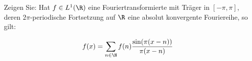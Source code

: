 
\begin{exercise}

Zeigen Sie:
Hat $f \in L^1(\R)$ eine Fouriertransformierte mit Träger in $[-\pi, \pi]$, deren $2 \pi$-periodische Fortsetzung auf $\R$ eine absolut konvergente Fouriereihe, so gilt:

\begin{align*}
    f(x)
    =
    \sum_{n \in \N}
    f(n)
    \frac
    {
        \sin(\pi (x - n))
    }{
        \pi (x - n)
    }
\end{align*}

\end{exercise}


